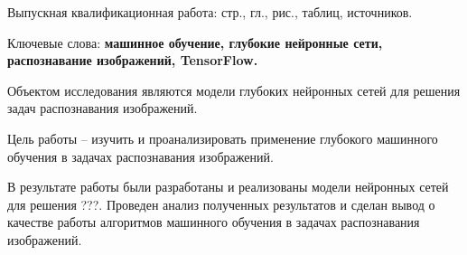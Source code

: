 
Выпускная квалификационная работа: \pageref{LastPage} стр., 
 гл., 
\totalfigures{} рис.,
\totaltables{} таблиц,
 источников.

Ключевые слова: \textbf{машинное обучение, глубокие нейронные сети, распознавание изображений, TensorFlow.}

Объектом исследования являются модели глубоких нейронных сетей для решения задач распознавания изображений. 

Цель работы – изучить и проанализировать применение глубокого машинного обучения в задачах распознавания изображений.

В результате работы были разработаны и реализованы модели нейронных сетей для решения ???. Проведен анализ полученных результатов и сделан вывод о качестве работы алгоритмов машинного обучения в задачах распознавания изображений.

\clearpage